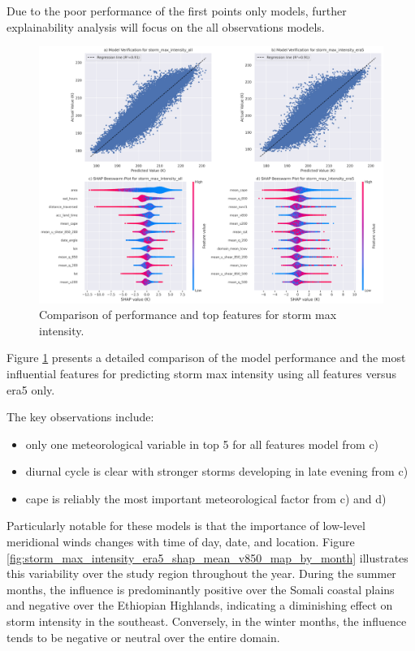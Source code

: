 Due to the poor performance of the first points only models, further explainability analysis will focus on the all observations models.

\begin{figure}[h]
    \centering
    \includegraphics[width=\textwidth]{../figures/generated/experiments/storm_max_intensity/storm_max_intensity_summary.png}
    \caption{Comparison of performance and top features for storm max intensity.}
    \label{fig:storm_max_intensity_summary}
\end{figure}

Figure \ref{fig:storm_max_intensity_summary} presents a detailed comparison of the model performance and the most influential features for predicting storm max intensity using all features versus \acrshort{era5} only.

The key observations include: 
\begin{itemize}
    \item only one meteorological variable in top 5 for all features model from c)
    \item diurnal cycle is clear with stronger storms developing in late evening from c)
    \item \acrshort{cape} is reliably the most important meteorological factor from c) and d)
\end{itemize}

Particularly notable for these models is that the importance of low-level meridional winds changes with time of day, date, and location. Figure \ref{fig:storm_max_intensity_era5_shap_mean_v850_map_by_month} illustrates this variability over the study region throughout the year. During the summer months, the influence is predominantly positive over the Somali coastal plains and negative over the Ethiopian Highlands, indicating a diminishing effect on storm intensity in the southeast. Conversely, in the winter months, the influence tends to be negative or neutral over the entire domain.


